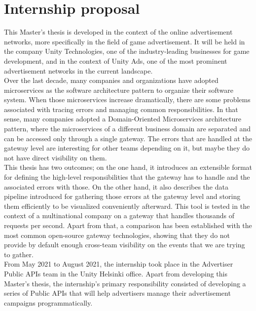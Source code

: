 \documentclass[12pt]{article}
\begin{document}


\section{Internship proposal}

This Master's thesis is developed in the context of the online advertisement networks, more specifically in the field of game advertisement. It will be held in the company Unity Technologies, one of the industry-leading businesses for game development, and in the context of Unity Ads, one of the most prominent advertisement networks in the current landscape.\\

Over the last decade, many companies and organizations have adopted microservices as the software architecture pattern to organize their software system. When those microservices increase dramatically, there are some problems associated with tracing errors and managing common responsibilities. In that sense, many companies adopted a Domain-Oriented Microservices architecture pattern, where the microservices of a different business domain are separated and can be accessed only through a single gateway. The errors that are handled at the gateway level are interesting for other teams depending on it, but maybe they do not have direct visibility on them.\\

This thesis has two outcomes; on the one hand, it introduces an extensible format for defining the high-level responsibilities that the gateway has to handle and the associated errors with those. On the other hand, it also describes the data pipeline introduced for gathering those errors at the gateway level and storing them efficiently to be visualized conveniently afterward. This tool is tested in the context of a multinational company on a gateway that handles thousands of requests per second. Apart from that, a comparison has been established with the most common open-source gateway technologies, showing that they do not provide by default enough cross-team visibility on the events that we are trying to gather.\\

From May 2021 to August 2021, the internship took place in the Advertiser Public APIs team in the Unity Helsinki office. Apart from developing this Master's thesis, the internship's primary responsibility consisted of developing a series of Public APIs that will help advertisers manage their advertisement campaigns programmatically.
\end{document}
